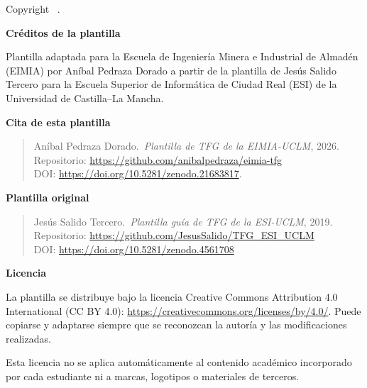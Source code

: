 \begingroup
\makeatletter
\thispagestyle{empty}
\small
\null\vfill

{\noindent\large\bfseries \@titulo\par}
\vspace{0.5cm}

\noindent Copyright \textcopyright{} \@yearTF\ \@autor.

\vspace{0.8cm}

\noindent\textbf{Créditos de la plantilla}

\vspace{0.25cm}

\noindent Plantilla adaptada para la Escuela de Ingeniería Minera e Industrial
de Almadén (EIMIA) por Aníbal Pedraza Dorado a partir de la plantilla de Jesús
Salido Tercero para la Escuela Superior de Informática de Ciudad Real (ESI)
de la Universidad de Castilla--La Mancha.

\vspace{0.5cm}

\noindent\textbf{Cita de esta plantilla}

\begin{quote}
Aníbal Pedraza Dorado.\ \emph{Plantilla de TFG de la EIMIA-UCLM}, 2026.\\
Repositorio: \url{https://github.com/anibalpedraza/eimia-tfg}\\
DOI: \url{https://doi.org/10.5281/zenodo.21683817}.
\end{quote}

\noindent\textbf{Plantilla original}

\begin{quote}
Jesús Salido Tercero.\ \emph{Plantilla guía de TFG de la ESI-UCLM}, 2019.\\
Repositorio: \url{https://github.com/JesusSalido/TFG_ESI_UCLM}\\
DOI: \url{https://doi.org/10.5281/zenodo.4561708}
\end{quote}

\noindent\textbf{Licencia}

\vspace{0.25cm}

\noindent La plantilla se distribuye bajo la licencia Creative Commons
Attribution 4.0 International (CC BY 4.0):
\url{https://creativecommons.org/licenses/by/4.0/}. Puede copiarse y adaptarse
siempre que se reconozcan la autoría y las modificaciones realizadas.

\noindent Esta licencia no se aplica automáticamente al contenido académico
incorporado por cada estudiante ni a marcas, logotipos o materiales de terceros.

\makeatother
\endgroup
\cleardoublepage
